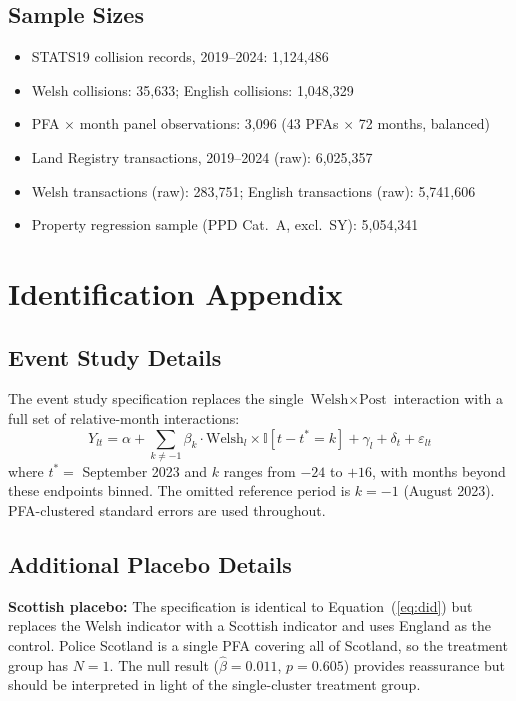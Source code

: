 \documentclass[12pt]{article}
\newcommand{\ind}{\mathbb{I}}
\begin{document}
\subsection{Sample Sizes}

\begin{itemize}
    \item STATS19 collision records, 2019--2024: 1,124,486
    \item Welsh collisions: 35,633; English collisions: 1,048,329
    \item PFA $\times$ month panel observations: 3,096 (43 PFAs $\times$ 72 months, balanced)
    \item Land Registry transactions, 2019--2024 (raw): 6,025,357
    \item Welsh transactions (raw): 283,751; English transactions (raw): 5,741,606
    \item Property regression sample (PPD Cat.~A, excl.~SY): 5,054,341
\end{itemize}


\section{Identification Appendix}

\subsection{Event Study Details}

The event study specification replaces the single $\text{Welsh} \times \text{Post}$ interaction with a full set of relative-month interactions:
\begin{equation}
Y_{lt} = \alpha + \sum_{k \neq -1} \beta_k \cdot \text{Welsh}_l \times \ind[t - t^* = k] + \gamma_l + \delta_t + \varepsilon_{lt}
\end{equation}
where $t^* = $ September 2023 and $k$ ranges from $-24$ to $+16$, with months beyond these endpoints binned. The omitted reference period is $k = -1$ (August 2023). PFA-clustered standard errors are used throughout.

\subsection{Additional Placebo Details}

\textbf{Scottish placebo:} The specification is identical to Equation~(\ref{eq:did}) but replaces the Welsh indicator with a Scottish indicator and uses England as the control. Police Scotland is a single PFA covering all of Scotland, so the treatment group has $N = 1$. The null result ($\hat{\beta} = 0.011$, $p = 0.605$) provides reassurance but should be interpreted in light of the single-cluster treatment group.
\end{document}
